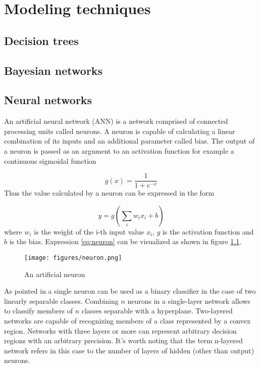 \documentclass[a4paper, 11pt]{book}
\begin{document}
\chapter{Modeling techniques}

\section{Decision trees}
\section{Bayesian networks}
\section{Neural networks}
An artificial neural network (ANN) is a network comprised of connected processing units called neurons. A neuron is capable of calculating a linear combination of its inputs and an additional parameter called bias. The output of a neuron is passed as an argument to an activation function for example a continuous sigmoidal function

\begin{equation} \label{eq:sigmoid}
g(x) = \frac{1}{1 + e^{-x}}
\end{equation}
Thus the value calculated by a neuron can be expressed in the form

\begin{equation} \label{eq:neuron}
y = g(\sum_{i} w_i x_i + b)
\end{equation}
where $w_i$ is the weight of the i-th input value $x_i$, $g$ is the activation function and $b$ is the bias. Expression \ref{eq:neuron} can be visualized as shown in figure \ref{fig:neuron}.

\begin{figure}[htp]
\centering
\texttt{[image: figures/neuron.png]}
\caption{An artificial neuron}
\label{fig:neuron}
\end{figure}

As pointed in \cite{BISHOP1995} a single neuron can be used as a binary classifier in the case of two linearly separable classes. Combining $n$ neurons in a single-layer network allows to classify members of $n$ classes separable with a hyperplane. Two-layered networks are capable of recognizing members of a class represented by a convex region. Networks with three layers or more can represent arbitrary decision regions with an arbitrary precision.
It's worth noting that the term n-layered network refers in this case to the number of layers of hidden (other than output) neurons.
\end{document}

